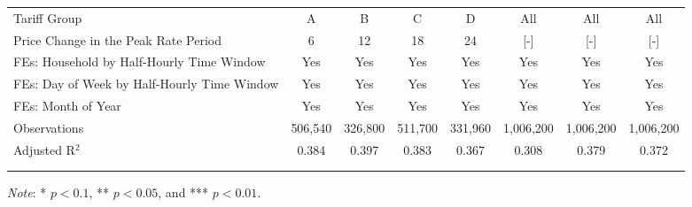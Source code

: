 {\begin{sidewaystable}[t!]
\begin{adjustbox}{scale = 1.00}
\begin{threeparttable}
\begin{tabular}{@{\extracolsep{1pt}}lccccccc}
                    Tariff Group & A & B & C & D & All & All & All \\
                    Price Change in the Peak Rate Period & 6 & 12 & 18 & 24 & [-] & [-] & [-] \\
                    FEs: Household by Half-Hourly Time Window & Yes & Yes & Yes & Yes & Yes & Yes & Yes \\
                    FEs: Day of Week by Half-Hourly Time Window & Yes & Yes & Yes & Yes & Yes & Yes & Yes \\
                    FEs: Month of Year & Yes & Yes & Yes & Yes & Yes & Yes & Yes \\
                    Observations & 506,540 & 326,800 & 511,700 & 331,960 & 1,006,200 & 1,006,200 & 1,006,200 \\
                    Adjusted R$^{2}$ & 0.384 & 0.397 & 0.383 & 0.367 & 0.308 & 0.379 & 0.372 \\
                    \\[-2.0ex]
                    \hline \hline
                    \\[-4.5ex]
                \end{tabular}
                \begin{tablenotes}[flushleft]
                    \footnotesize
                    \item \textit{Note}: * $p < 0.1$, ** $p < 0.05$, and *** $p < 0.01$.
                \end{tablenotes}
            \end{threeparttable}
        \end{adjustbox}
    \end{sidewaystable}
}
